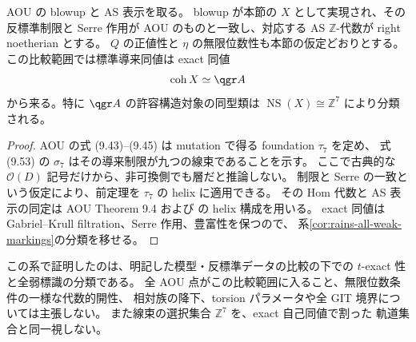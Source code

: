 \begin{corollary}\label{cor:aou-rains-exact-region}
AOU \cite[\S9, Theorem 9.4]{AOU} の blowup と AS 表示を取る。
blowup が本節の $X$ として実現され、その反標準制限と Serre 作用が
AOU のものと一致し、対応する AS $\mathbb Z$-代数が right noetherian とする。
$Q$ の正値性と $\eta$ の無限位数性も本節の仮定どおりとする。
この比較範囲では標準導来同値は exact 同値
\[
 \operatorname{coh}X\simeq\qgr A
\]
から来る。特に $\qgr A$ の許容構造対象の同型類は
$\operatorname{NS}(X)\cong\mathbb Z^7$ により分類される。
\end{corollary}
\begin{proof}
AOU の式 (9.43)--(9.45) は mutation で得る foundation $\tau_7$ を定め、
式 (9.53) の $\sigma_7$ はその導来制限が九つの線束であることを示す。
ここで古典的な $\mathcal O(D)$ 記号だけから、非可換側でも層だと推論しない。
制限と Serre の一致という仮定により、前定理を
$\tau_7$ の helix に適用できる。
その Hom 代数と AS 表示の同定は AOU Theorem 9.4 および
\cite[\S3]{OU2025}の helix 構成を用いる。
exact 同値は Gabriel--Krull filtration、Serre 作用、豊富性を保つので、
系\ref{cor:rains-all-weak-markings}の分類を移せる。
\end{proof}

この系で証明したのは、明記した模型・反標準データの比較の下での
$t$-exact 性と全弱標識の分類である。
全 AOU 点がこの比較範囲に入ること、無限位数条件の一様な代数的開性、
相対族の降下、torsion パラメータや全 GIT 境界については主張しない。
また線束の選択集合 $\mathbb Z^7$ を、exact 自己同値で割った
軌道集合と同一視しない。
